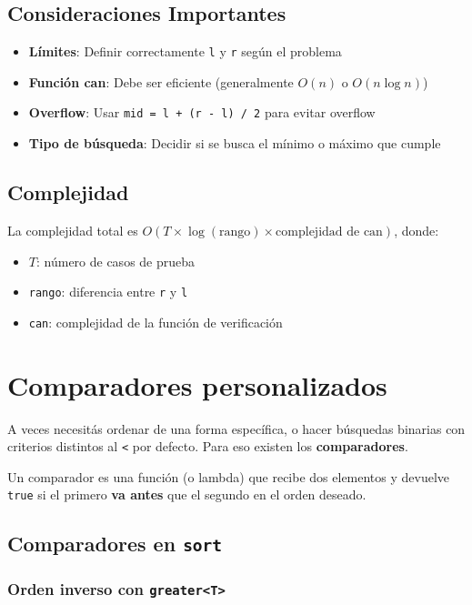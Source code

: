 \subsection{Consideraciones Importantes}
\begin{itemize}
	\item \textbf{Límites}: Definir correctamente \texttt{l} y \texttt{r} según el problema
	\item \textbf{Función can}: Debe ser eficiente (generalmente $O(n)$ o $O(n \log n)$)
	\item \textbf{Overflow}: Usar \texttt{mid = l + (r - l) / 2} para evitar overflow
	\item \textbf{Tipo de búsqueda}: Decidir si se busca el mínimo o máximo que cumple
\end{itemize}

\subsection{Complejidad}
La complejidad total es $O(T \times \log(\text{rango}) \times \text{complejidad de can})$, donde:
\begin{itemize}
	\item $T$: número de casos de prueba
	\item \texttt{rango}: diferencia entre \texttt{r} y \texttt{l}
	\item \texttt{can}: complejidad de la función de verificación
\end{itemize}


\section{Comparadores personalizados}

A veces necesitás ordenar de una forma específica, o hacer búsquedas binarias con criterios distintos al \texttt{<} por defecto. Para eso existen los \textbf{comparadores}.

Un comparador es una función (o lambda) que recibe dos elementos y devuelve \texttt{true} si el primero \textbf{va antes} que el segundo en el orden deseado.

\subsection{Comparadores en \texttt{sort}}

\subsubsection{Orden inverso con \texorpdfstring{\texttt{greater\textless T\textgreater}}{greater(T)}}

